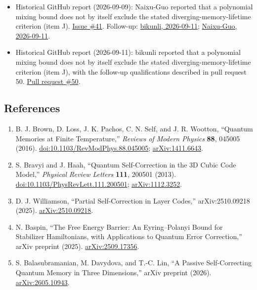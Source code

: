 \begin{itemize}
  \item Historical GitHub report (2026-09-09): Naixu-Guo reported that a polynomial mixing bound does not by itself exclude the stated diverging-memory-lifetime criterion (item J). \href{https://github.com/Naixu-Guo/quantum-open-problems/issues/41}{Issue \#41}. Follow-up: \href{https://github.com/Naixu-Guo/quantum-open-problems/issues/41#issuecomment-5628256055}{bikunli, 2026-09-11}; \href{https://github.com/Naixu-Guo/quantum-open-problems/issues/41#issuecomment-5628982142}{Naixu-Guo, 2026-09-11}.

  \item Historical GitHub report (2026-09-11): bikunli reported that a polynomial mixing bound does not by itself exclude the stated diverging-memory-lifetime criterion (item J), with the follow-up qualifications described in pull request 50. \href{https://github.com/Naixu-Guo/quantum-open-problems/pull/50}{Pull request \#50}.
\end{itemize}

\subsection*{References}

\begin{enumerate}[label={},leftmargin=4.8em,labelsep=0.5em]
  \footnotesize
  \item[\textup{[BLP+16]}]\label{ref:p9-brown-review}
  B. J. Brown, D. Loss, J. K. Pachos, C. N. Self, and J. R. Wootton,
  ``Quantum Memories at Finite Temperature,''
  \emph{Reviews of Modern Physics} \textbf{88}, 045005 (2016).
  \href{https://doi.org/10.1103/RevModPhys.88.045005}{doi:10.1103/RevModPhys.88.045005};
  \href{https://arxiv.org/abs/1411.6643}{arXiv:1411.6643}.

  \item[\textup{[BH13]}]\label{ref:p9-bravyi-haah}
  S. Bravyi and J. Haah,
  ``Quantum Self-Correction in the 3D Cubic Code Model,''
  \emph{Physical Review Letters} \textbf{111}, 200501 (2013).
  \href{https://doi.org/10.1103/PhysRevLett.111.200501}{doi:10.1103/PhysRevLett.111.200501};
  \href{https://arxiv.org/abs/1112.3252}{arXiv:1112.3252}.

  \item[\textup{[Wil25]}]\label{ref:p9-williamson}
  D. J. Williamson,
  ``Partial Self-Correction in Layer Codes,'' arXiv:2510.09218 (2025).
  \href{https://arxiv.org/abs/2510.09218}{arXiv:2510.09218}.

  \item[\textup{[Bas25]}]\label{ref:p9-baspin}
  N. Baspin, ``The Free Energy Barrier: An Eyring--Polanyi Bound for
  Stabilizer Hamiltonians, with Applications to Quantum Error Correction,''
  arXiv preprint (2025).
  \href{https://arxiv.org/abs/2509.17356}{arXiv:2509.17356}.

  \item[\textup{[BDL26]}]\label{ref:p9-balasubramanian-davydova-lin}
  S. Balasubramanian, M. Davydova, and T.-C. Lin,
  ``A Passive Self-Correcting Quantum Memory in Three Dimensions,'' arXiv
  preprint (2026).
  \href{https://arxiv.org/abs/2605.10943}{arXiv:2605.10943}.
\end{enumerate}

